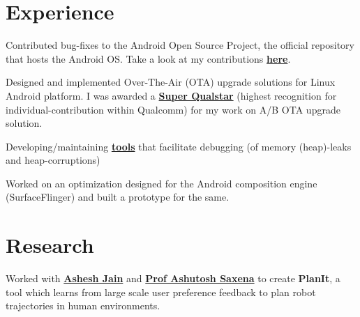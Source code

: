 \documentclass[]{deedy-resume-openfont}
\begin{document}
\hfill
\begin{minipage}[t]{0.66\textwidth} 


\section{Experience}
\vspace{\topsep} %
\begin{tightemize}
\item Contributed bug-fixes to the Android Open Source Project, the official repository that hosts the Android OS. Take a look at my contributions \textbf{\href{https://android-review.googlesource.com/q/shibing}{here}}.
\item Designed and implemented Over-The-Air (OTA) upgrade solutions for Linux Android platform. I was awarded a \textbf{\href{https://www.slideshare.net/slideshow/embed_code/key/uhvsweQaLamkiG} {Super Qualstar}} (highest recognition for individual-contribution within Qualcomm) for my work on A/B OTA upgrade solution.
\item Developing/maintaining \textbf{\href{https://source.codeaurora.org/quic/la/platform/bionic/commit/?h=android-framework.lnx.3.1&id=0c0fee17b7f39e841f6ef5d305adb1d5189dfb25}{tools}} that facilitate debugging (of memory (heap)-leaks and heap-corruptions)
\end{tightemize}
\sectionsep

\vspace{\topsep} %
\begin{tightemize}
\item Worked on an optimization designed for the Android composition engine (SurfaceFlinger) and built a prototype for the same.
\end{tightemize}
\sectionsep


\section{Research}
Worked with \textbf{\href{http://www.cs.cornell.edu/~ashesh/}{Ashesh Jain}} and \textbf{\href{http://www.cs.cornell.edu/~asaxena/}{Prof Ashutosh Saxena}} to create \textbf{PlanIt}, a tool which  learns from large scale user preference feedback to plan robot trajectories in human environments.  
\sectionsep


\end{minipage}
\end{document}
